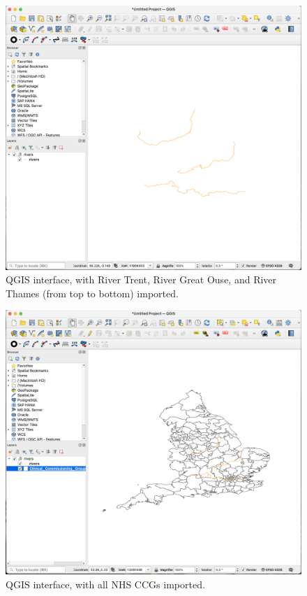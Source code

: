 \documentclass[Afour,sagev,times]{sagej}
\begin{document}
{
\begin{figure}[H]
    \centering
    \includegraphics[width=\columnwidth]{import_rivers.png}
    \caption{QGIS interface, with River Trent, River Great Ouse, and River Thames (from top to bottom) imported.}
    \label{fig:import_rivers}
\end{figure}

\begin{figure}[H]
    \centering
    \includegraphics[width=\columnwidth]{import_ccgs.png}
    \caption{QGIS interface, with all NHS CCGs imported.}
    \label{fig:import_ccgs}
\end{figure}

}
\end{document}
